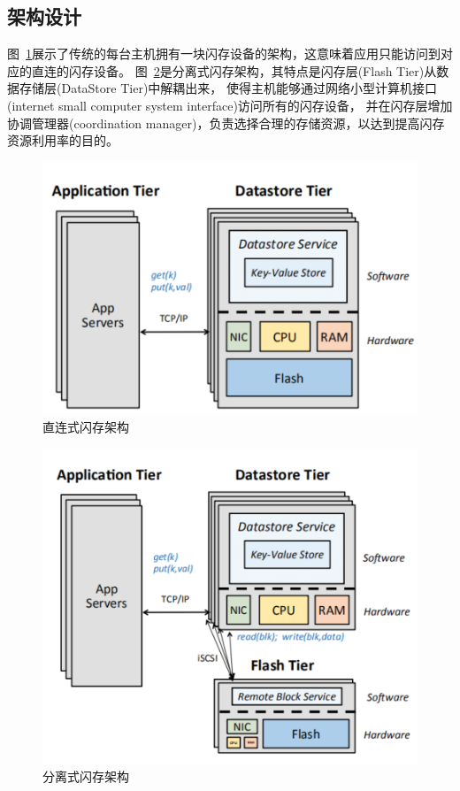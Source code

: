 \subsection{架构设计}

图~\ref{fig:d-a_flash_architecture}展示了传统的每台主机拥有一块闪存设备的架构，这意味着应用只能访问到对应的直连的闪存设备。
图~\ref{fig:dis_flash_architecture}是分离式闪存架构，其特点是闪存层(Flash Tier)从数据存储层(DataStore Tier)中解耦出来，
使得主机能够通过网络小型计算机接口(internet small computer system interface)访问所有的闪存设备，
并在闪存层增加协调管理器(coordination manager)，负责选择合理的存储资源，以达到提高闪存资源利用率的目的。

\begin{figure}
\centering
\includegraphics[scale=0.8]{Figures/storage/d-a_flash_architecture.jpg}
\decoRule
\caption{直连式闪存架构}
\label{fig:d-a_flash_architecture}
\end{figure}

\begin{figure}
\centering
\includegraphics[scale=0.8]{Figures/storage/dis_flash_architecture.jpg}
\decoRule
\caption{分离式闪存架构}
\label{fig:dis_flash_architecture}
\end{figure}

